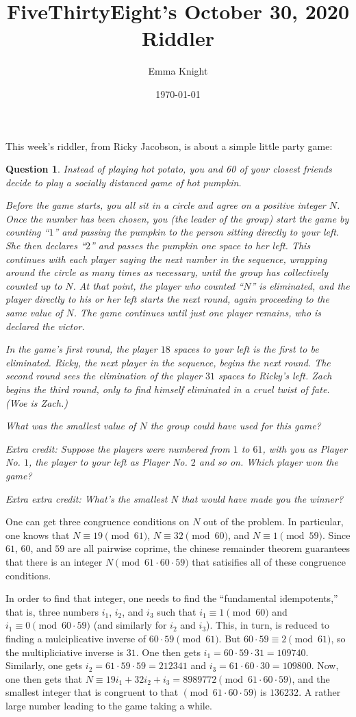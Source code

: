 \documentclass[11pt]{article}
\title{FiveThirtyEight's October 30, 2020 Riddler}
\author{Emma Knight}
\date{\today}
\newtheorem{question}[theorem]{Question}
\theoremstyle{definition}
\begin{document}
\maketitle
This week's riddler, from Ricky Jacobson, is about a simple little party game:
\begin{question}
Instead of playing hot potato, you and 60 of your closest friends decide to play a socially distanced game of hot pumpkin.

Before the game starts, you all sit in a circle and agree on a positive integer $N$. Once the number has been chosen, you (the leader of the group) start the game by counting ``$1$'' and passing the pumpkin to the person sitting directly to your left. She then declares ``$2$'' and passes the pumpkin one space to her left. This continues with each player saying the next number in the sequence, wrapping around the circle as many times as necessary, until the group has collectively counted up to $N$. At that point, the player who counted ``$N$'' is eliminated, and the player directly to his or her left starts the next round, again proceeding to the same value of $N$. The game continues until just one player remains, who is declared the victor.

In the game’s first round, the player $18$ spaces to your left is the first to be eliminated. Ricky, the next player in the sequence, begins the next round. The second round sees the elimination of the player $31$ spaces to Ricky’s left. Zach begins the third round, only to find himself eliminated in a cruel twist of fate. (Woe is Zach.)

What was the smallest value of $N$ the group could have used for this game?

Extra credit: Suppose the players were numbered from $1$ to $61$, with you as Player No. $1$, the player to your left as Player No. $2$ and so on. Which player won the game?

Extra extra credit: What’s the smallest N that would have made you the winner?
\end{question}
One can get three congruence conditions on $N$ out of the problem.  In particular, one knows that $N \equiv 19 \pmod{61}$, $N \equiv 32 \pmod{60}$, and $N \equiv 1 \pmod{59}$.  Since $61$, $60$, and $59$ are all pairwise coprime, the chinese remainder theorem guarantees that there is an integer $N \pmod{61\cdot 60\cdot 59}$ that satisifies all of these congruence conditions.

In order to find that integer, one needs to find the ``fundamental idempotents,'' that is, three numbers $i_1$, $i_2$, and $i_3$ such that $i_1 \equiv 1\pmod{60}$ and $i_1 \equiv 0 \pmod{60\cdot59}$ (and similarly for $i_2$ and $i_3$).  This, in turn, is reduced to finding a mulciplicative inverse of $60\cdot59\pmod{61}$.  But $60\cdot59\equiv 2\pmod{61}$, so the multipliciative inverse is $31$.  One then gets $i_1 = 60\cdot59\cdot31 = 109740$.  Similarly, one gets $i_2 = 61\cdot 59 \cdot 59 = 212341$ and $i_3 = 61\cdot60\cdot30 = 109800$.  Now, one then gets that $N \equiv 19i_1 + 32i_2 + i_3 = 8989772 \pmod{61\cdot60\cdot59}$, and the smallest integer that is congruent to that $\pmod{61\cdot60\cdot59}$ is $136232$.  A rather large number leading to the game taking a while.
\end{document}
